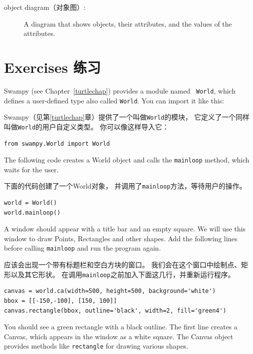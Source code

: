 \documentclass[10pt]{book}
\begin{document}
\begin{CJK}{UTF8}{gbsn}
\begin{description}
\item[object diagram（对象图）:] A diagram that shows objects, their
attributes, and the values of the attributes.

\end{description}


\section{Exercises 练习}

\begin{exercise}
\label{canvas}

Swampy (see Chapter~\ref{turtlechap}) provides a module named {\tt
  World}, which defines a user-defined type also called {\tt World}.
You can import it like this:

Swampy（见第\ref{turtlechap}章）提供了一个叫做{\tt World}的模块，
它定义了一个同样叫做{\tt World}的用户自定义类型。
你可以像这样导入它：

\begin{verbatim}
from swampy.World import World
\end{verbatim}

The following code creates a World object and calls
the {\tt mainloop} method, which
waits for the user.

下面的代码创建了一个World对象，
并调用了{\tt mainloop}方法，等待用户的操作。

\begin{verbatim}
world = World()
world.mainloop()
\end{verbatim}

A window should appear with a title bar and an empty square.
We will use this window to draw Points,
Rectangles and other shapes.  
Add the following lines before calling
\verb"mainloop" and run the program again.

应该会出现一个带有标题栏和空白方块的窗口。
我们会在这个窗口中绘制点、矩形以及其它形状。
在调用\verb"mainloop"之前加入下面这几行，并重新运行程序。

\begin{verbatim}
canvas = world.ca(width=500, height=500, background='white')
bbox = [[-150,-100], [150, 100]]
canvas.rectangle(bbox, outline='black', width=2, fill='green4')
\end{verbatim}

You should see a green rectangle with a black outline.
The first line creates a Canvas, which appears in the window
as a white square.  The Canvas object provides methods like
{\tt rectangle} for drawing various shapes.


\end{exercise}
\end{CJK}
\end{document}
